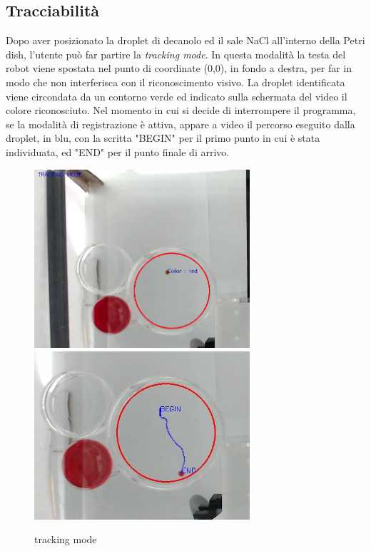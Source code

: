 \subsection{Tracciabilità}
\label{sec:123}
Dopo aver posizionato la droplet di decanolo ed il sale NaCl all'interno della Petri dish, l'utente può far partire la \emph{tracking mode}. In questa modalità la testa del robot viene spostata nel punto di coordinate (0,0), in fondo a destra, per far in modo che non interferisca con il riconoscimento visivo. 
La droplet identificata viene circondata da un contorno verde ed indicato sulla schermata del video il colore riconosciuto. Nel momento in cui si decide di interrompere il programma, se la modalità di registrazione è attiva, appare a video il percorso eseguito dalla droplet, in blu, con la scritta "BEGIN" per il primo punto in cui è stata individuata, ed "END" per il punto finale di arrivo.   
\begin{figure}[h]
	\centering
   		{\includegraphics[width=8cm]{immagini/track.jpg}}
 	\hspace{2mm}   	
		{\includegraphics[width=8cm]{immagini/track_path.jpg}}
	\caption{tracking mode}
\end{figure}



